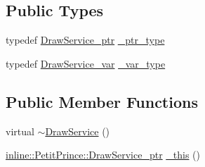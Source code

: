 \subsection*{Public Types}
\begin{DoxyCompactItemize}
\item 
typedef \hyperlink{_petit_prince_8hpp_a65d1c7d29682996870d909fc2b3b5d82}{Draw\+Service\+\_\+ptr} \hyperlink{class_draw_service_a452c5d2edf70f25bc3fb7027548adb90}{\+\_\+ptr\+\_\+type}
\item 
typedef \hyperlink{_petit_prince_8hpp_aaa2c9a4c8b5ab19df3aceb2bdd9a2275}{Draw\+Service\+\_\+var} \hyperlink{class_draw_service_a110e8421361b653ce8fca4aeefc7db2b}{\+\_\+var\+\_\+type}
\end{DoxyCompactItemize}
\subsection*{Public Member Functions}
\begin{DoxyCompactItemize}
\item 
virtual \hyperlink{class_draw_service_aac2a148525031026ad1fa42250aa25f7}{$\sim$\+Draw\+Service} ()
\item 
\hyperlink{_petit_prince_8hpp_a65d1c7d29682996870d909fc2b3b5d82}{inline\+::\+Petit\+Prince\+::\+Draw\+Service\+\_\+ptr} \hyperlink{class_draw_service_a5adf4a24cf9c7fd98b46430f3b978ad1}{\+\_\+this} ()
\end{DoxyCompactItemize}
